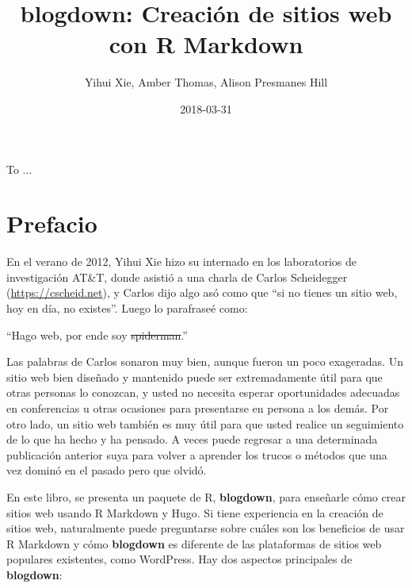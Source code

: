 \documentclass[12pt,]{krantz}
\title{blogdown: Creación de sitios web con R Markdown}
\author{Yihui Xie, Amber Thomas, Alison Presmanes Hill}
\date{2018-03-31}
\renewenvironment{quote}{\begin{VF}}{\end{VF}}
\theoremstyle{definition}
\theoremstyle{definition}
\theoremstyle{definition}
\theoremstyle{remark}
\begin{document}
\maketitle

\cleardoublepage\newpage\thispagestyle{empty}\null
\cleardoublepage\newpage\thispagestyle{empty}
\begin{center}
To ...
\end{center}

\setlength{\abovedisplayskip}{-5pt}
\frontmatter

{
\hypersetup{linkcolor=}
\setcounter{tocdepth}{2}
\tableofcontents
}
\listoftables
\listoffigures
\hypertarget{prefacio}{%
\chapter*{Prefacio}\label{prefacio}}


En el verano de 2012, Yihui Xie hizo su internado en los laboratorios de
investigación AT\&T, donde asistió a una charla de Carlos Scheidegger
(\url{https://cscheid.net}), y Carlos dijo algo asó como que ``si no
tienes un sitio web, hoy en día, no existes''. Luego lo parafraseé como:

\begin{quote}
``Hago web, por ende soy \sout{spiderman}.''
\end{quote}

Las palabras de Carlos sonaron muy bien, aunque fueron un poco
exageradas. Un sitio web bien diseñado y mantenido puede ser
extremadamente útil para que otras personas lo conozcan, y usted no
necesita esperar oportunidades adecuadas en conferencias u otras
ocasiones para presentarse en persona a los demás. Por otro lado, un
sitio web también es muy útil para que usted realice un seguimiento de
lo que ha hecho y ha pensado. A veces puede regresar a una determinada
publicación anterior suya para volver a aprender los trucos o métodos
que una vez dominó en el pasado pero que olvidó.

En este libro, se presenta un paquete de R, \textbf{blogdown}, para
enseñarle cómo crear sitios web usando R Markdown y Hugo. Si tiene
experiencia en la creación de sitios web, naturalmente puede preguntarse
sobre cuáles son los beneficios de usar R Markdown y cómo
\textbf{blogdown} es diferente de las plataformas de sitios web
populares existentes, como WordPress. Hay dos aspectos principales de
\textbf{blogdown}:
\end{document}
